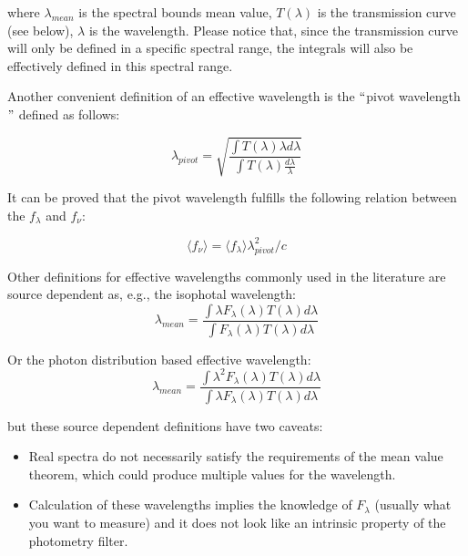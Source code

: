 \documentclass[11pt,a4paper]{ivoa}
\begin{document}
where $\lambda_{mean}$ is the spectral bounds mean value, $T(\lambda)$ is 
the transmission curve (see below), $\lambda$ is the wavelength. Please 
notice that, since the transmission curve will only be defined in a specific 
spectral range, the integrals will also be effectively defined in this 
spectral range.
\par

Another convenient definition of an effective wavelength is the 
$``$pivot wavelength$"$  defined as follows:

\begin{equation} \label{eq:17}
\lambda_{pivot} = \sqrt{\frac{\int T(\lambda)\lambda d\lambda}{\int T(\lambda)\frac{d\lambda}{\lambda}}}
\end{equation}

It can be proved that the pivot wavelength fulfills the following 
relation between the $f_\lambda$ and  $f_\nu $:

\begin{equation} \label{eq:18}
\langle f_\nu \rangle =\langle f_\lambda \rangle \lambda^2_{pivot}/c
\end{equation}

Other definitions for effective wavelengths commonly used in the literature 
are source dependent as, e.g., the isophotal wavelength:
\begin{equation} \label{eq:19}
\lambda_{mean} = \frac{\int \lambda F_\lambda(\lambda)T(\lambda)d\lambda}{\int F_\lambda(\lambda)T(\lambda)d\lambda}
\end{equation}

Or the photon distribution based effective wavelength:
\begin{equation} \label{eq:20}
\lambda_{mean} = \frac{\int \lambda^2 F_\lambda(\lambda)T(\lambda)d\lambda}{\int \lambda F_\lambda(\lambda)T(\lambda)d\lambda}
\end{equation}

but these source dependent definitions have two caveats:

\begin{itemize}
	\item{Real spectra do not necessarily satisfy the requirements of the mean value theorem, 
	which could produce multiple values for the wavelength.}

	\item{Calculation of these wavelengths implies the knowledge of $F_\lambda $ (usually 
	what you want to measure) and it does not look like an intrinsic property of the 
	photometry filter.}
\end{itemize}\par
\end{document}
